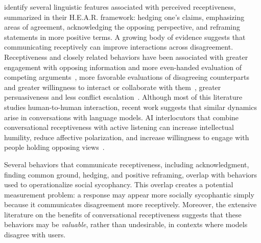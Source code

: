 \documentclass[letterpaper]{article} %
\begin{document}
\citet{yeomans_conversational_2020} identify several linguistic features associated with perceived receptiveness, summarized in their H.E.A.R. framework: hedging one's claims, emphasizing areas of agreement, acknowledging the opposing perspective, and reframing statements in more positive terms. A growing body of evidence suggests that communicating receptively can improve interactions across disagreement. Receptiveness and closely related behaviors have been associated with greater engagement with opposing information and more even-handed evaluation of competing arguments~\citep{minson_why_2020}, more favorable evaluations of disagreeing counterparts and greater willingness to interact or collaborate with them~\citep{chen_tell_2010, yeomans_conversational_2020, reschke_friends_2026}, greater persuasiveness and less conflict escalation~\citep{yeomans_conversational_2020}. Although most of this literature studies human-to-human interaction, recent work suggests that similar dynamics arise in conversations with language models. AI interlocutors that combine conversational receptiveness with active listening can increase intellectual humility, reduce affective polarization, and increase willingness to engage with people holding opposing views~\citep{hruschka_reducing_2026}.

Several behaviors that communicate receptiveness, including acknowledgment, finding common ground, hedging, and positive reframing, overlap with behaviors used to operationalize social sycophancy. This overlap creates a potential measurement problem: a response may appear more socially sycophantic simply because it communicates disagreement more receptively. Moreover, the extensive literature on the benefits of conversational receptiveness suggests that these behaviors may be \textit{valuable}, rather than undesirable, in contexts where models disagree with users. 


\end{document}
